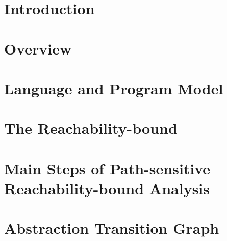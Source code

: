 \documentclass[runningheads]{llncs}
\begin{document}
\section{Introduction}
\label{sec:intro}

\section{Overview}
\label{sec:overview}

\section{{Language and Program Model}}
\label{sec:language}

\section{{The Reachability-bound}}
\label{sec:execution_rb}

\section{Main Steps of Path-sensitive Reachability-bound Analysis}
\label{sec:static_rb}

\section{Abstraction Transition Graph}
\label{sec:progabs}

\end{document}
